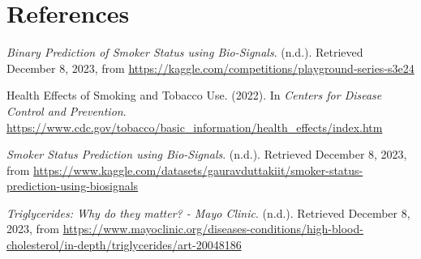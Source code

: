 \documentclass[
  12pt,
  letterpaper,
]{article}
\newlength{\cslhangindent}
\newlength{\cslentryspacingunit} %
\newenvironment{CSLReferences}[2] %
 {%
  \setlength{\parindent}{0pt}
  \ifodd #1
  \let\oldpar\par
  \def\par{\hangindent=\cslhangindent\oldpar}
  \fi
  \setlength{\parskip}{#2\cslentryspacingunit}
 }%
 {}
\begin{document}
\hypertarget{bibliography}{%
\section*{References}\label{bibliography}}

\hypertarget{refs}{}
\begin{CSLReferences}{1}{0}
\leavevmode{}%
\emph{Binary {Prediction} of {Smoker} {Status} using {Bio}-{Signals}}.
(n.d.). Retrieved December 8, 2023, from
\url{https://kaggle.com/competitions/playground-series-s3e24}

\leavevmode{}%
Health {Effects} of {Smoking} and {Tobacco} {Use}. (2022). In
\emph{Centers for Disease Control and Prevention}.
\url{https://www.cdc.gov/tobacco/basic_information/health_effects/index.htm}

\leavevmode{}%
\emph{Smoker {Status} {Prediction} using {Bio}-{Signals}}. (n.d.).
Retrieved December 8, 2023, from
\url{https://www.kaggle.com/datasets/gauravduttakiit/smoker-status-prediction-using-biosignals}

\leavevmode{}%
\emph{Triglycerides: {Why} do they matter? - {Mayo} {Clinic}}. (n.d.).
Retrieved December 8, 2023, from
\url{https://www.mayoclinic.org/diseases-conditions/high-blood-cholesterol/in-depth/triglycerides/art-20048186}

\end{CSLReferences}
\end{document}
